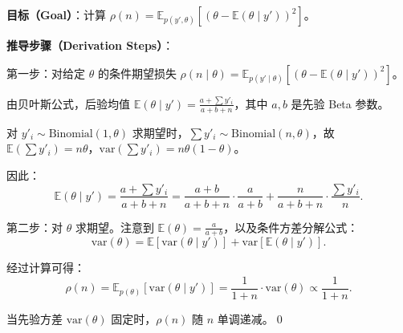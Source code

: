 \textbf{目标（Goal）}：计算 $\rho(n) = \mathbb{E}_{p(y', \theta)}[(\theta - \mathbb{E}(\theta \mid y'))^2]$。

\textbf{推导步骤（Derivation Steps）}：

第一步：对给定 $\theta$ 的条件期望损失 $\rho(n \mid \theta) = \mathbb{E}_{p(y'\mid\theta)}[(\theta - \mathbb{E}(\theta \mid y'))^2]$。

由贝叶斯公式，后验均值 $\mathbb{E}(\theta \mid y') = \frac{a + \sum y'_i}{a + b + n}$，其中 $a, b$ 是先验 Beta 参数。

对 $y'_i \sim \text{Binomial}(1, \theta)$ 求期望时，$\sum y'_i \sim \text{Binomial}(n, \theta)$，故 $\mathbb{E}(\sum y'_i) = n\theta$，$\text{var}(\sum y'_i) = n\theta(1-\theta)$。

因此：
\[
\mathbb{E}(\theta \mid y') = \frac{a + \sum y'_i}{a + b + n}
= \frac{a + b}{a + b + n} \cdot \frac{a}{a+b} + \frac{n}{a + b + n} \cdot \frac{\sum y'_i}{n}.
\]

第二步：对 $\theta$ 求期望。注意到 $\mathbb{E}(\theta) = \frac{a}{a+b}$，以及条件方差分解公式：
\[
\text{var}(\theta) = \mathbb{E}[\text{var}(\theta \mid y')] + \text{var}[\mathbb{E}(\theta \mid y')].
\]

经过计算可得：
\[
\rho(n) = \mathbb{E}_{p(\theta)}[\text{var}(\theta \mid y')]
= \frac{1}{1 + n} \cdot \text{var}(\theta)
\propto \frac{1}{1 + n}.
\]

当先验方差 $\text{var}(\theta)$ 固定时，$\rho(n)$ 随 $n$ 单调递减。\qed

\endinput
